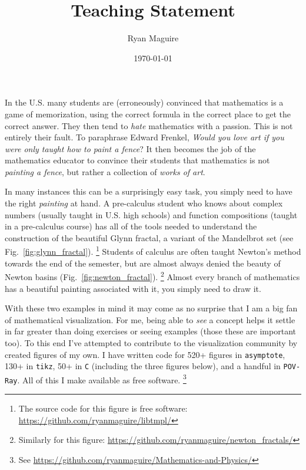 \documentclass{article}
\title{Teaching Statement}
\author{Ryan Maguire}
\date{\today}
\begin{document}
    \maketitle
    In the U.S. many students are (erroneously) convinced that
    mathematics is a game of memorization, using the correct formula in the
    correct place to get the correct answer. They then tend to \textit{hate}
    mathematics with a passion. This is not entirely their fault. To paraphrase
    Edward Frenkel,
    \textit{Would you love art if you were only taught how to paint a fence}?
    It then becomes the job of the mathematics educator to convince their
    students that mathematics is not \textit{painting a fence}, but rather
    a collection of \textit{works of art}.
    \par\hfill\par
    In many instances this can be a surprisingly easy task, you simply need to
    have the right \textit{painting} at hand.
    A pre-calculus student who knows about complex
    numbers (usually taught in U.S. high schools) and function compositions
    (taught in a pre-calculus course) has all of the tools needed to understand
    the construction of the beautiful Glynn fractal, a variant of the
    Mandelbrot set (see Fig.~\ref{fig:glynn_fractal}).%
    \footnote{%
        The source code for this figure is free software:
        \url{https://github.com/ryanmaguire/libtmpl/}
    }
    Students of calculus are often taught Newton's method towards the end
    of the semester, but are almost always denied the beauty of Newton basins
    (Fig.~\ref{fig:newton_fractal}).%
    \footnote{%
        Similarly for this figure:
        \url{https://github.com/ryanmaguire/newton_fractals/}
    }
    Almost every branch of mathematics has a beautiful painting associated with
    it, you simply need to draw it.
    \par\hfill\par
    With these two examples in mind
    it may come as no surprise that I am a big fan of mathematical
    visualization. For me, being able to \textit{see} a concept helps it settle
    in far greater than doing exercises or seeing examples (those these are
    important too). To this end I've attempted to contribute to the
    visualization community by created figures of my own. I have written
    code for 520+ figures in \texttt{asymptote}, 130+ in \texttt{tikz},
    50+ in \texttt{C} (including the three figures below), and a handful in
    \texttt{POV-Ray}. All of this I make available as free software.%
    \footnote{%
        See
        \url{https://github.com/ryanmaguire/Mathematics-and-Physics/}
    }
\end{document}
